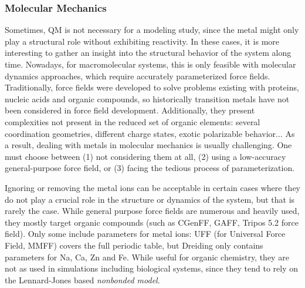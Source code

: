 \subsubsection{Molecular Mechanics}
Sometimes, QM is not necessary for a modeling study, since the metal might only play a structural role without exhibiting reactivity. In these cases, it is more interesting to gather an insight into the structural behavior of the system along time. Nowadays, for macromolecular systems, this is only feasible with molecular dynamics approaches, which require accurately parameterized force fields. Traditionally, force fields were developed to solve problems existing with proteins, nucleic acids and organic compounds,\cite{lifson1968consistent,allinger1973,momany1975energy} so historically transition metals have not been considered in force field development. Additionally, they present complexities not present in the reduced set of organic elements: several coordination geometries, different charge states, exotic polarizable behavior... As a result, dealing with metals in molecular mechanics is usually challenging. One must choose between (1) not considering them at all, (2) using a low-accuracy general-purpose force field, or (3) facing the tedious process of parameterization.

Ignoring or removing the metal ions can be acceptable in certain cases where they do not play a crucial role in the structure or dynamics of the system, but that is rarely the case. While general purpose force fields are numerous and heavily used, they mostly target organic compounds (such as CGenFF,\cite{Vanommeslaeghe2009} GAFF,\cite{Wang2004} Tripos 5.2 force field\cite{clark1989}). Only some include parameters for metal ions: UFF (for Universal Force Field,\cite{Rappe1992} MMFF\cite{halgren1996}) covers the full periodic table, but Dreiding\cite{Mayo1990} only contains parameters for Na, Ca, Zn and Fe. While useful for organic chemistry, they are not as used in simulations including biological systems, since they tend to rely on the Lennard-Jones based \textit{nonbonded model}.

